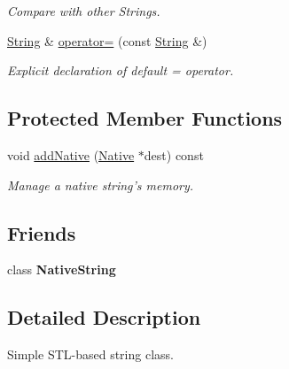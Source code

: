 \begin{DoxyCompactItemize}
\begin{DoxyCompactList}\small\item\em Compare with other Strings. \end{DoxyCompactList}\item 
\hypertarget{classGUI_1_1String_a9461e1429fccdfe75403be8bcff78e60}{\hyperlink{classGUI_1_1String}{String} \& \hyperlink{classGUI_1_1String_a9461e1429fccdfe75403be8bcff78e60}{operator=} (const \hyperlink{classGUI_1_1String}{String} \&)}\label{classGUI_1_1String_a9461e1429fccdfe75403be8bcff78e60}

\begin{DoxyCompactList}\small\item\em Explicit declaration of default = operator. \end{DoxyCompactList}\end{DoxyCompactItemize}
\subsection*{Protected Member Functions}
\begin{DoxyCompactItemize}
\item 
\hypertarget{classGUI_1_1String_aee056eca155c99dcda0c4f65899e7b1f}{void \hyperlink{classGUI_1_1String_aee056eca155c99dcda0c4f65899e7b1f}{add\-Native} (\hyperlink{classGUI_1_1String_1_1Native}{Native} $\ast$dest) const }\label{classGUI_1_1String_aee056eca155c99dcda0c4f65899e7b1f}

\begin{DoxyCompactList}\small\item\em Manage a native string's memory. \end{DoxyCompactList}\end{DoxyCompactItemize}
\subsection*{Friends}
\begin{DoxyCompactItemize}
\item 
\hypertarget{classGUI_1_1String_adf0ad3438dafc3424870951a9f75f05e}{class {\bfseries Native\-String}}\label{classGUI_1_1String_adf0ad3438dafc3424870951a9f75f05e}

\end{DoxyCompactItemize}


\subsection{Detailed Description}
Simple S\-T\-L-\/based string class. 

